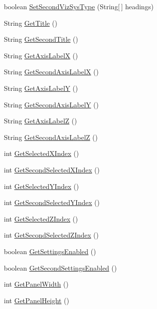 \begin{DoxyCompactItemize}
\item 
boolean \hyperlink{class_setting_j_panel_a8c7f693b437db5e8890346d34b68f034}{Set\-Second\-Viz\-Sys\-Type} (String\mbox{[}$\,$\mbox{]} headings)
\item 
String \hyperlink{class_setting_j_panel_a6cfc2b28e65ad6b225137660445e782a}{Get\-Title} ()
\item 
String \hyperlink{class_setting_j_panel_ac3180cd3580d14425b1bdaa66aaf3d98}{Get\-Second\-Title} ()
\item 
String \hyperlink{class_setting_j_panel_a34e7268bb7e2dafb51bff0a81c91ae79}{Get\-Axis\-Label\-X} ()
\item 
String \hyperlink{class_setting_j_panel_a043e52d7819def149ebd16e970aea508}{Get\-Second\-Axis\-Label\-X} ()
\item 
String \hyperlink{class_setting_j_panel_a2e1a90cd3ad567d66ce8a4c99fb59d9e}{Get\-Axis\-Label\-Y} ()
\item 
String \hyperlink{class_setting_j_panel_a6ab00c064d9bc103328188cf01b252c2}{Get\-Second\-Axis\-Label\-Y} ()
\item 
String \hyperlink{class_setting_j_panel_a23ce003414b5fefe6fda97d1c282ccb0}{Get\-Axis\-Label\-Z} ()
\item 
String \hyperlink{class_setting_j_panel_a58e88f0beebb429d7311924a07dae840}{Get\-Second\-Axis\-Label\-Z} ()
\item 
int \hyperlink{class_setting_j_panel_a3f22bf0303fdcd171842558a6577c6ac}{Get\-Selected\-X\-Index} ()
\item 
int \hyperlink{class_setting_j_panel_a08607519a288552eac8b0f4bf89a1a19}{Get\-Second\-Selected\-X\-Index} ()
\item 
int \hyperlink{class_setting_j_panel_a3d94c6447f40c93a1a62a486d9642a9b}{Get\-Selected\-Y\-Index} ()
\item 
int \hyperlink{class_setting_j_panel_a4b52c9cb35b9450fa667942085fbb75f}{Get\-Second\-Selected\-Y\-Index} ()
\item 
int \hyperlink{class_setting_j_panel_a8ca1d551d5ef0db315edca6f123a5e44}{Get\-Selected\-Z\-Index} ()
\item 
int \hyperlink{class_setting_j_panel_a9452c1c3050642bcec0af5591fd9f437}{Get\-Second\-Selected\-Z\-Index} ()
\item 
boolean \hyperlink{class_setting_j_panel_a2ad9d316118129421cd3706f7f4e3998}{Get\-Settings\-Enabled} ()
\item 
boolean \hyperlink{class_setting_j_panel_a64a2366145bd68a57ce6f263b7e0a864}{Get\-Second\-Settings\-Enabled} ()
\item 
int \hyperlink{class_setting_j_panel_a116f4d7091e9f0ed859b7682aa4e1b6b}{Get\-Panel\-Width} ()
\item 
int \hyperlink{class_setting_j_panel_ad1010855cd475f58407a67cdcf210157}{Get\-Panel\-Height} ()
\end{DoxyCompactItemize}
